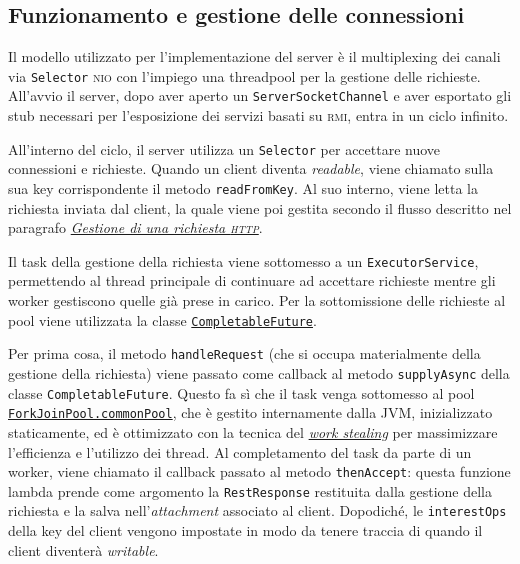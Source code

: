 \documentclass[a4paper,8pt]{article} %
\def\code#1{\texttt{#1}}
\begin{document}
\subsection{Funzionamento e gestione delle connessioni}
Il modello utilizzato per l'implementazione del server è il multiplexing dei canali via \code{Selector} \textsc{nio} con l'impiego una threadpool per la gestione delle richieste.
All'avvio il server, dopo aver aperto un \code{ServerSocketChannel} e aver esportato gli stub necessari per l'esposizione dei servizi basati su \textsc{rmi},
entra in un ciclo infinito.
\par All'interno del ciclo, il server utilizza un \code{Selector} per accettare nuove connessioni e richieste.
Quando un client diventa \emph{readable}, viene chiamato sulla sua key corrispondente il metodo \code{readFromKey}. Al suo interno, viene letta la richiesta inviata dal client,
la quale viene poi gestita secondo il flusso descritto nel paragrafo \hyperref[sec:http_flow]{\emph{Gestione di una richiesta \textsc{http}}}.

\par Il task della gestione della richiesta viene sottomesso a un \code{ExecutorService}, permettendo al thread principale di continuare ad accettare richieste mentre gli worker gestiscono quelle già prese in carico.
Per la sottomissione delle richieste al pool viene utilizzata la classe \href{https://docs.oracle.com/javase/8/docs/api/java/util/concurrent/CompletableFuture.html}{\code{CompletableFuture}}.
\par Per prima cosa, il metodo \code{handleRequest} (che si occupa materialmente della gestione della richiesta) viene passato come callback al metodo \code{supplyAsync} della classe \code{CompletableFuture}.
Questo fa sì che il task venga sottomesso al pool \href{https://medium.com/swlh/the-unfairly-unknown-forkjoinpool-c262777def6a}{\code{ForkJoinPool.commonPool}}, che è gestito internamente dalla JVM, inizializzato staticamente, ed è ottimizzato con la tecnica del \href{https://en.wikipedia.org/wiki/Work_stealing}{\emph{work stealing}} per massimizzare l'efficienza e l'utilizzo dei thread.
Al completamento del task da parte di un worker, viene chiamato il callback passato al metodo \code{thenAccept}: questa funzione lambda prende come argomento la \code{RestResponse} restituita dalla gestione della richiesta e la salva nell'\emph{attachment} associato al client.
Dopodiché, le \code{interestOps} della key del client vengono impostate in modo da tenere traccia di quando il client diventerà \emph{writable}.
\end{document}
